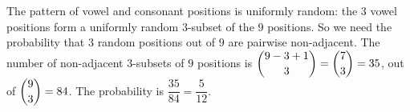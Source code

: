 The pattern of vowel and consonant positions is uniformly random: the $3$ vowel positions form a uniformly random $3$-subset of the $9$ positions. So we need the probability that $3$ random positions out of $9$ are pairwise non-adjacent. The number of non-adjacent $3$-subsets of $9$ positions is $\dbinom{9-3+1}{3}=\dbinom73=35$, out of $\dbinom93=84$. The probability is $\dfrac{35}{84}=\boxed{\dfrac{5}{12}}$.
